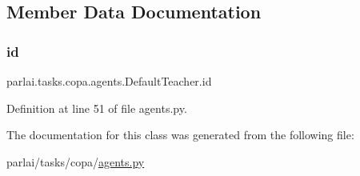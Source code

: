 \subsection{Member Data Documentation}
\mbox{\label{classparlai_1_1tasks_1_1copa_1_1agents_1_1DefaultTeacher_aa8f1b5e4b4493e80ed37fd6cb5d3b696}} 
\subsubsection{\texorpdfstring{id}{id}}
{\footnotesize\ttfamily parlai.\+tasks.\+copa.\+agents.\+Default\+Teacher.\+id}



Definition at line 51 of file agents.\+py.



The documentation for this class was generated from the following file\+:\begin{DoxyCompactItemize}
\item 
parlai/tasks/copa/\hyperlink{parlai_2tasks_2copa_2agents_8py}{agents.\+py}\end{DoxyCompactItemize}
